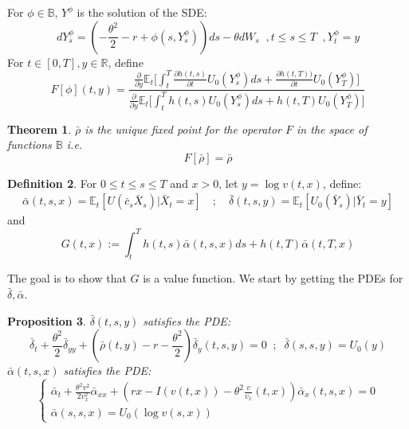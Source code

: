 \documentclass[11pt, psfig]{article}
\newtheorem{theorem}{Theorem}[section]
\newtheorem{proposition}[theorem]{Proposition}
\theoremstyle{definition}
\newtheorem{definition}[theorem]{Definition}
\theoremstyle{remark}
\numberwithin{equation}{section}
\def\sR{\mathbb{R}}
\def\sR{\mathbb{R}}
\def\sE{\mathbb{E}}
\newcommand{\be}{\begin{equation}}
\newcommand{\ee}{\end{equation}}
\begin{document}
For $\phi\in \mathbb{B}$, 
$Y^{\phi}$ is the solution of the SDE:
 \begin{equation}
dY_{s}^{\phi}=(-\frac{\theta^2}{2}-r+\phi(s,Y_{s}^{\phi}))ds-\theta dW_{s} \;\; , t\leq s\leq T \;\; ,  Y_t^{\phi}=y 
\end{equation}
For $t\in [0,T], y\in \sR$, define  
 \begin{equation}
F[\phi](t,y)= \frac{\frac{\partial }{\partial y} \sE_{t}\bigg[\int_{t}^{T}\frac{\partial h(t,s)}{\partial t}U_0(Y_s^{\phi})ds+\frac{\partial h(t,T))}{\partial t}U_0(Y_T^{\phi})\bigg]}{\frac{\partial }{\partial y} \sE_{t}\bigg[\int_{t}^{T}h(t,s)U_0(Y_s^{\phi})ds+h(t,T)U_0(Y_T^{\phi})\bigg]}
 \end{equation}
\begin{theorem}
$\bar{\rho}$ is the unique fixed point for the operator $F$ in the space of functions $\mathbb{B}$ i.e.
\be
F[\bar{\rho}]= \bar{\rho}
\ee
\end{theorem}



\begin{definition}
For $0\leq t\leq s\leq T$ and $x>0$, let $y=\log v(t,x)$, define:
\begin{eqnarray}
\bar{\alpha}(t,s,x) = \sE_t[U(\bar{c}_s \bar{X}_s)| \bar{X}_t=x] \quad ; \quad 
\bar{\delta}(t,s,y) = \sE_t[U_0(\bar{Y}_s)| \bar{Y}_t=y]
\end{eqnarray}
and
\be
G(t,x) := \int_t^T h(t,s) \bar{\alpha}(t,s,x)ds + h(t,T) \bar{\alpha}(t,T,x)
\ee
\end{definition}
The goal is to show that $G$ is a value function. We start by getting the PDEs for $\bar{\delta}, \bar{\alpha}$.

\begin{proposition}\label{PDE_alpha_delta}
$\bar{\delta}(t,s,y)$ satisfies the PDE:
\begin{equation}\label{PDE_bardelta}
\bar{\delta}_t+\frac{\theta^2}{2}\bar{\delta}_{yy}+(\bar{\rho}(t,y)-r-\frac{\theta^2}{2})\bar{\delta}_y(t,s,y) =0\;\; ; \;\; \bar{\delta}(s,s,y)=U_0(y)
\end{equation}
$\bar{\alpha}(t,s,x)$ satisfies the PDE:
\begin{equation}\label{PDE_baralpha}
\begin{cases}
\bar{\alpha}_t+\frac{\theta^2 v^2}{2v_x^2}\bar{\alpha}_{xx}+( r x -I(v(t,x))-\theta^2 \frac{v}{v_{x}}(t, x)   )\bar{\alpha}_x(t,s,x) =0\\\bar{\alpha}(s,s,x)=U_0(\log v(s,x))
\end{cases}
\end{equation}

\end{proposition}
\end{document}

